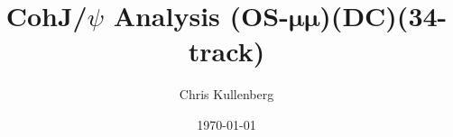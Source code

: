 \title{CohJ/$\psi$ Analysis (\textbf{OS}-$\boldsymbol{\mu\mu}$)(\textbf{DC})(\textbf{34-track})}
\author{Chris Kullenberg}
\date{\today}

